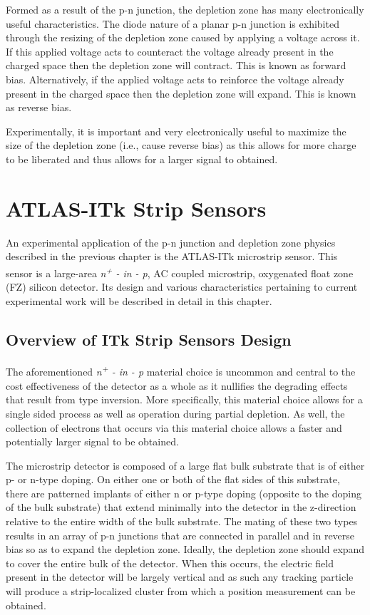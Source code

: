 \documentclass[letterpaper, 11pt]{report}
\begin{document}
Formed as a result of the p-n junction, the depletion zone has many electronically useful characteristics.  The diode nature of a planar p-n junction is exhibited through the resizing of the depletion zone caused by applying a voltage across it.  If this applied voltage acts to counteract the voltage already present in the charged space then the depletion zone will contract.  This is known as forward bias.  Alternatively, if the applied voltage acts to reinforce the voltage already present in the charged space then the depletion zone will expand.  This is known as reverse bias.

Experimentally, it is important and very electronically useful to maximize the size of the depletion zone (i.e., cause reverse bias) as this allows for more charge to be liberated and thus allows for a larger signal to obtained. 


\chapter{ATLAS-ITk Strip Sensors}

An experimental application of the p-n junction and depletion zone physics described in the previous chapter is the ATLAS-ITk microstrip sensor.  This sensor is a large-area \textit{n\textsuperscript{+} - in - p}, AC coupled microstrip, oxygenated float zone (FZ) silicon detector.  Its design and various characteristics pertaining to current experimental work will be described in detail in this chapter.

\section{Overview of ITk Strip Sensors Design}

The aforementioned \textit{n\textsuperscript{+} - in - p} material choice is uncommon and central to the cost effectiveness of the detector as a whole as it nullifies the degrading effects that result from type inversion.  More specifically, this material choice allows for a single sided process as well as operation during partial depletion.  As well, the collection of electrons that occurs via this material choice allows a faster and potentially larger signal to be obtained.

The microstrip detector is composed of a large flat bulk substrate that is of either p- or n-type doping.  On either one or both of the flat sides of this substrate, there are patterned implants of either n or p-type doping (opposite to the doping of the bulk substrate) that extend minimally into the detector in the z-direction relative to the entire width of the bulk substrate.  The mating of these two types results in an array of p-n junctions that are connected in parallel and in reverse bias so as to expand the depletion zone.  Ideally, the depletion zone should expand to cover the entire bulk of the detector.  When this occurs, the electric field present in the detector will be largely vertical and as such any tracking particle will produce a strip-localized cluster from which a position measurement can be obtained.
\end{document}

